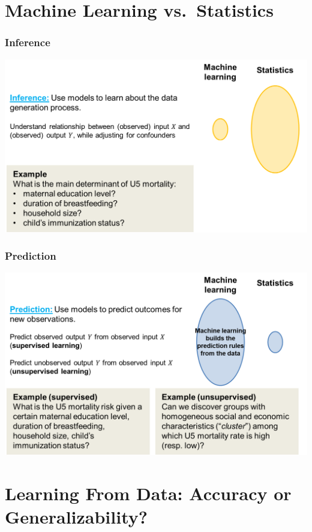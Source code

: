 \documentclass[
  letterpaper,
  DIV=11,
  numbers=noendperiod]{scrreprt}
\begin{document}
\hypertarget{machine-learning-vs.-statistics}{%
\section{Machine Learning
vs.~Statistics}\label{machine-learning-vs.-statistics}}

\hypertarget{inference}{%
\subsubsection{Inference}\label{inference}}

\includegraphics{./images/paste-C70B4C10.png}

\hypertarget{prediction}{%
\subsubsection{Prediction}\label{prediction}}

\includegraphics{./images/paste-2C4E6936.png}

\hypertarget{learning-from-data-accuracy-or-generalizability}{%
\section{Learning From Data: Accuracy or
Generalizability?}\label{learning-from-data-accuracy-or-generalizability}}
\end{document}
